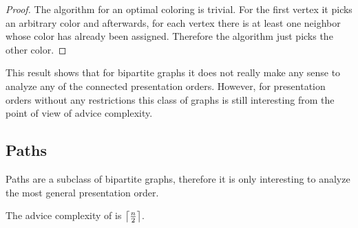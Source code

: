 \begin{proof}
    The algorithm for an optimal coloring is trivial. For the first vertex
    it picks an arbitrary color and afterwards, for each vertex there is
    at least one neighbor whose color has already been assigned. Therefore
    the algorithm just picks the other color.
\end{proof}

This result shows that for bipartite graphs it does not really make any
sense to analyze any of the connected presentation orders. However, for
presentation orders without any restrictions this class of graphs is still
interesting from the point of view of advice complexity.

\subsection{Paths}

Paths are a subclass of bipartite graphs, therefore it is only interesting
to analyze the most general presentation order.

\begin{theorem}\label{theorem:paths-any}
    The advice complexity of  is
    $\ceil*{\frac{n}{2}}$.
\end{theorem}

